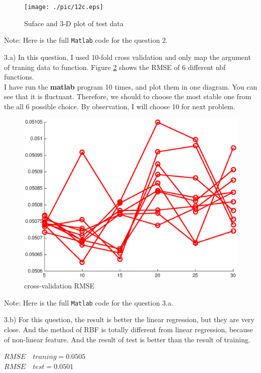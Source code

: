 \documentclass{article}
\begin{document}
\begin{figure}[H]
    \centering
    \texttt{[image: ./pic/12c.eps]}
    \caption{Suface and 3-D plot of test data}
    \label{fig:12c}
\end{figure}

Note: Here is the full \verb|Matlab| code for the question 2.


3.a) In this question, I used 10-fold cross validation and only map the argument of traning data to function. Figure \ref{fig:13a} shows the 
RMSE of 6 different nbf functions.\\
I have run the \textbf{matlab} program 10 times, and plot them in one diagram. You can see that it is fluctuant. Therefore, we should to choose the 
most stable one from the all 6 possible choice. By observation, I will choose 10 for next problem.

\begin{figure}[H]
    \centering
    \includegraphics[keepaspectratio=true,width=\linewidth]{./pic/13a.eps}
    \caption{cross-validation RMSE}
    \label{fig:13a}
\end{figure}

Note: Here is the full \verb|Matlab| code for the question 3.a.


3.b) For this question, the result is better the linear regression, but they are very close. And the method of RBF is totally different from 
linear regression, because of non-linear feature. And the result of test is better than the result of training.

\begin{center}
$RMSE \quad traning = 0.0505$ \\
$RMSE \quad test = 0.0501$ 
 \end{center}
\end{document}
